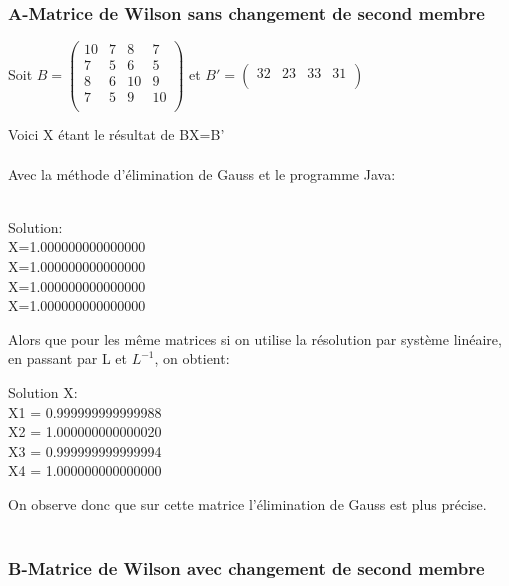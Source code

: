 \documentclass[a4paper,12pt]{report}
\begin{document}
\subsubsection{A-Matrice de Wilson sans changement de second membre}

\begin{center}
	Soit 
	$B=\begin{pmatrix}
	10&7&8&7\\
	7&5&6&5\\
	8&6&10&9\\
	7&5&9&10\\
	\end{pmatrix}$   
	et
	$B'=\begin{pmatrix}
	32&23&33&31\\
	\end{pmatrix}$\\
\end{center}
Voici X étant le résultat de BX=B' 
\\
\\Avec la méthode d'élimination de Gauss et le programme Java:\\
\\
\begin{center}
	Solution:\\
	X=1.000000000000000\\
	X=1.000000000000000\\
	X=1.000000000000000\\
	X=1.000000000000000\\
\end{center}
Alors que pour les même matrices si on utilise la résolution par système linéaire, en passant par L et $L^{-1}$, on obtient: \\

\begin{center}
	Solution X:\\
	X1 = 0.999999999999988\\
	X2 = 1.000000000000020\\
	X3 = 0.999999999999994\\
	X4 = 1.000000000000000\\
\end{center}

On observe donc que sur cette matrice l'élimination de Gauss est plus précise.\\
\\

\subsubsection{B-Matrice de Wilson avec changement de second membre}
\end{document}
